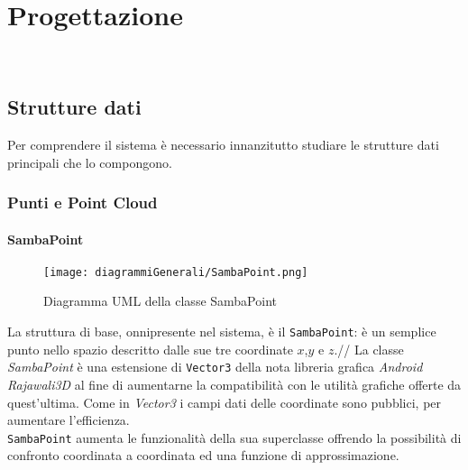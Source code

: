
\chapter{Progettazione}
\label{cap:progettazione-codifica}

\\


\section{Strutture dati}
Per comprendere il sistema è necessario innanzitutto studiare le strutture dati principali che lo compongono.\\

\subsection{Punti e Point Cloud}

\subsubsection{SambaPoint}
\begin{figure}[H] 
    \centering 
    \texttt{[image: diagrammiGenerali/SambaPoint.png]} 
    \caption{Diagramma UML della classe SambaPoint}
\end{figure}
La struttura di base, onnipresente nel sistema, è il \texttt{SambaPoint}: è un semplice punto nello spazio descritto dalle sue tre coordinate $x$,$y$ e $z$.//
La classe \emph{SambaPoint} è una estensione di \texttt{Vector3} della nota libreria grafica \emph{Android} \emph{Rajawali3D} al fine di aumentarne la compatibilità con le utilità grafiche offerte da quest'ultima. Come in \emph{Vector3} i campi dati delle coordinate sono pubblici, per aumentare l'efficienza.\\
\texttt{SambaPoint} aumenta le funzionalità della sua superclasse offrendo la possibilità di confronto coordinata a coordinata ed una funzione di approssimazione. 

